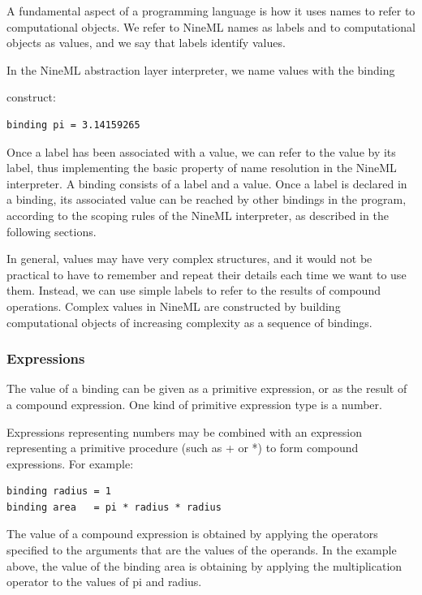 \documentclass[a4paper]{article}
\begin{document}
A fundamental aspect of a programming language is how it uses names to
refer to computational objects.  We refer to NineML names as labels
and to computational objects as values, and we say that labels
identify values.

In the NineML abstraction layer interpreter, we name values with the binding

construct:
\begin{lstlisting}[style=display]
binding pi = 3.14159265
\end{lstlisting}

Once a label has been associated with a value, we can refer to the
value by its label, thus implementing the basic property of name
resolution in the NineML interpreter. A binding consists of a label
and a value. Once a label is declared in a binding, its associated
value can be reached by other bindings in the program, according to
the scoping rules of the NineML interpreter, as described in the
following sections.

In general, values may have very complex structures, and it would not
be practical to have to remember and repeat their details each time we
want to use them. Instead, we can use simple labels to refer to the
results of compound operations. Complex values in NineML are
constructed by building computational objects of increasing complexity
as a sequence of bindings.


\subsubsection{Expressions}

The value of a binding can be given as a primitive expression, or as
the result of a compound expression. One kind of primitive expression
type is a number.

Expressions representing numbers may be combined with an expression
representing a primitive procedure (such as + or *) to form compound
expressions. For example:


\begin{lstlisting}[style=display]
binding radius = 1
binding area   = pi * radius * radius
\end{lstlisting}

The value of a compound expression is obtained by applying the
operators specified to the arguments that are the values of the
operands. In the example above, the value of the binding area is
obtaining by applying the multiplication operator to the values of pi
and radius.
\end{document}
